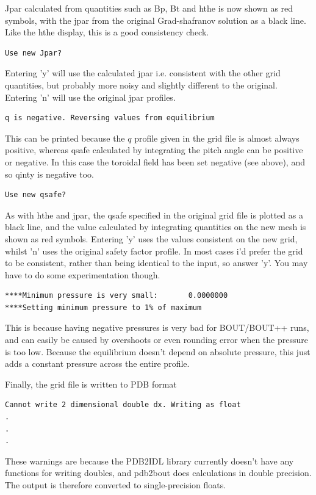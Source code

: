 \documentclass[12pt]{article}
\begin{document}
Jpar calculated from quantities such as Bp, Bt and hthe is now shown as red symbols, with the jpar from the original Grad-shafranov solution as a black line. Like the hthe display, this is a good consistency check.
\begin{verbatim}
Use new Jpar?
\end{verbatim}
Entering 'y' will use the calculated jpar i.e. consistent with the other grid quantities, but probably more noisy and slightly different to the original. Entering 'n' will use the original jpar profiles.

\begin{verbatim}
q is negative. Reversing values from equilibrium
\end{verbatim}
This can be printed because the $q$ profile given in the grid file is almost always positive, whereas qsafe calculated by integrating the pitch angle can be positive or negative. In this case the toroidal field has been set negative (see above), and so qinty is negative too.

\begin{verbatim}
Use new qsafe?
\end{verbatim}
As with hthe and jpar, the qsafe specified in the original grid file is plotted as a black line, and the value calculated by integrating quantities on the new mesh is shown as red symbols. Entering 'y' uses the values consistent on the new grid, whilst 'n' uses the original safety factor profile. In most cases i'd prefer the grid to be consistent, rather than being identical to the input, so answer 'y'. You may have to do some experimentation though.

\begin{verbatim}
****Minimum pressure is very small:       0.0000000
****Setting minimum pressure to 1% of maximum
\end{verbatim}
This is because having negative pressures is very bad for BOUT/BOUT++ runs, and can easily be caused by overshoots or even rounding error when the pressure is too low. Because the equilibrium doesn't depend on absolute pressure, this just adds a constant pressure across the entire profile.

Finally, the grid file is written to PDB format
\begin{verbatim}
Cannot write 2 dimensional double dx. Writing as float
.
.
.
\end{verbatim}
These warnings are because the PDB2IDL library currently doesn't have any functions for writing doubles, and pdb2bout does calculations in double precision. The output is therefore converted to single-precision floats.
\end{document}
